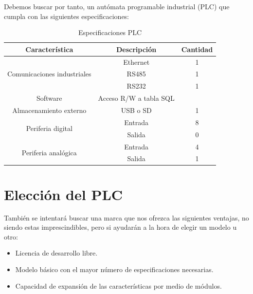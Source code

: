 Debemos buscar por tanto, un autómata programable industrial (PLC) que cumpla con las siguientes especificaciones:

\begin{table}[H]
\centering
\begin{tabular}{|c|c|c|}
\hline
\textbf{Característica }                              & \textbf{Descripción}            & \textbf{Cantidad} \\ \hline
\multirow{3}{*}{Comunicaciones industriales} & Ethernet               & 1        \\ \cline{2-3} 
                                             & RS485                  & 1        \\ \cline{2-3} 
                                             & RS232                  & 1        \\ \hline
Software                                     & Acceso R/W a tabla SQL &          \\ \hline
Almacenamiento externo                       & USB o SD               & 1        \\ \hline
\multirow{2}{*}{Periferia digital}           & Entrada                & 8        \\ \cline{2-3} 
                                             & Salida                 & 0        \\ \hline
\multirow{2}{*}{Periferia analógica}         & Entrada                & 4        \\ \cline{2-3} 
                                             & Salida                 & 1        \\ \hline
\end{tabular}
\caption{Especificaciones PLC}
\label{tab:espc_plc}
\end{table}

\section{Elección del PLC}
\label{eleccion_PLC}

También se intentará buscar una marca que nos ofrezca las siguientes ventajas, no siendo estas imprescindibles, pero si ayudarán a la hora de elegir un modelo u otro:

\begin{itemize}
		\item{Licencia de desarrollo libre.}
		\item{Modelo básico con el mayor número de especificaciones necesarias.}
		\item{Capacidad de expansión de las características por medio de módulos.}
\end{itemize}

